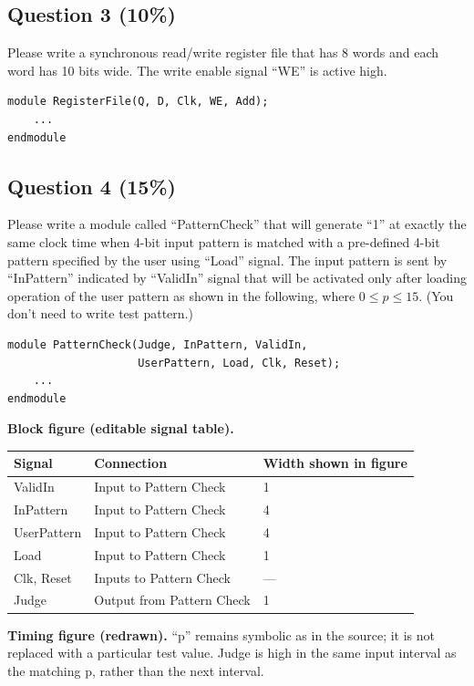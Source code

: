 \documentclass[11pt,a4paper]{article}
\newcommand{\question}[2]{\subsection*{Question #1 \hfill (#2\%)}}
\newcommand{\bus}[3]{%
  \draw (#2,#1)--({#2+.13},{#1+.17})--({#2+.87},{#1+.17})--({#2+1},#1)
    --({#2+.87},{#1-.17})--({#2+.13},{#1-.17})--cycle;
  \node[font=\scriptsize] at ({#2+.5},#1) {#3};}
\newcommand{\clockrow}[2]{%
  \node[anchor=east,font=\small] at (-.2,#1) {Clk};
  \foreach \i in {0,...,#2} {
    \draw (\i,#1)--(\i,{#1+.3})--({\i+.5},{#1+.3})--({\i+.5},#1)--({\i+1},#1);}}
\begin{document}
\question{3}{10}
Please write a synchronous read/write register file that has 8 words and
each word has 10 bits wide. The write enable signal ``WE'' is active high.
\begin{verbatim}
module RegisterFile(Q, D, Clk, WE, Add);
    ...
endmodule
\end{verbatim}

\question{4}{15}
Please write a module called ``PatternCheck'' that will generate ``1'' at
exactly the same clock time when 4-bit input pattern is matched with a
pre-defined 4-bit pattern specified by the user using ``Load'' signal.
The input pattern is sent by ``InPattern'' indicated by ``ValidIn'' signal
that will be activated only after loading operation of the user pattern
as shown in the following, where $0\leq p\leq15$.
(You don't need to write test pattern.)
\begin{verbatim}
module PatternCheck(Judge, InPattern, ValidIn,
                    UserPattern, Load, Clk, Reset);
    ...
endmodule
\end{verbatim}
\textbf{Block figure (editable signal table).}
\begin{center}
\begin{tabular}{lll}\toprule
Signal & Connection & Width shown in figure\\\midrule
ValidIn & Input to Pattern Check & 1\\
InPattern & Input to Pattern Check & 4\\
UserPattern & Input to Pattern Check & 4\\
Load & Input to Pattern Check & 1\\
Clk, Reset & Inputs to Pattern Check & ---\\
Judge & Output from Pattern Check & 1\\\bottomrule
\end{tabular}
\end{center}
\textbf{Timing figure (redrawn).} ``p'' remains symbolic as in the source;
it is not replaced with a particular test value. Judge is high in the
same input interval as the matching p, rather than the next interval.
\begin{center}
\end{center}
\end{document}
